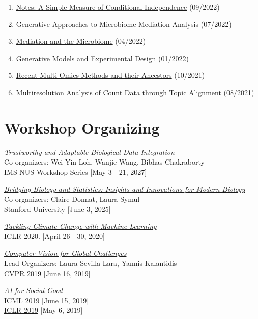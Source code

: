 \documentclass[letterpaper]{article}
\renewenvironment{itemize}{
  \begin{list}{}{
    \setlength{\leftmargin}{1.5em}
  }
}{
  \end{list}
}
\begin{document}
\begin{enumerate}
  \item \href{https://krisrs1128.github.io/talks/2022/20220930/20220930.html}{Notes: A Simple Measure of Conditional Independence} (09/2022)
  \item \href{https://drive.google.com/file/d/1n6gEubzFuIRRRYxGewY81k1ZdQS24oKg/view}{Generative Approaches to Microbiome Mediation Analysis} (07/2022)
  \item \href{https://drive.google.com/file/d/17xNjMA-pH70wM_gknUnM0A5gr0k87gAo/view}{Mediation and the Microbiome} (04/2022)
  \item \href{https://drive.google.com/file/d/1OMIulBki_0an7Lwd0MKPGH1f0OdK0etH/view}{Generative Models and Experimental Design} (01/2022)
  \item \href{https://drive.google.com/file/d/1L2crRIcdbql__XZdJuiRXkAKsvwrIZLO/view}{Recent Multi-Omics Methods and their Ancestors} (10/2021)
  \item \href{https://drive.google.com/file/d/1VcXF0fAK2IlA3yXeqnJ_1CGC6BP4zPqp/view}{Multiresolution Analysis of Count Data through Topic Alignment} (08/2021)
\end{enumerate}

\section*{Workshop Organizing}

\begin{itemize}

\item \textit{Trustworthy and Adaptable Biological Data Integration}\\
Co-organizers: Wei-Yin Loh, Wanjie Wang, Bibhas Chakraborty\\
IMS-NUS Workshop Series [May 3 - 21, 2027]

\item \href{https://www.eventcreate.com/e/stats4modernbiology}{\textit{Bridging Biology and Statistics: Insights and Innovations for Modern Biology}}\\
Co-organizers: Claire Donnat, Laura Symul\\
Stanford University [June 3, 2025]

\item \href{https://www.climatechange.ai/events/iclr2020}{\textit{Tackling Climate Change with Machine Learning}}\\
ICLR 2020. [April 26 - 30, 2020]

\item \href{https://www.cv4gc.org/cvpr2019/}{\textit{Computer Vision for Global Challenges}}\\
Lead Organizers: Laura Sevilla-Lara, Yannis Kalantidis\\
CVPR 2019 [June 16, 2019]

\item \textit{AI for Social Good} \\
\href{https://aiforsocialgood.github.io/icml2019/}{ICML 2019} [June 15, 2019]\\
\href{https://aiforsocialgood.github.io/icml2019}{ICLR 2019} [May 6, 2019]
\end{itemize}
\end{document}
